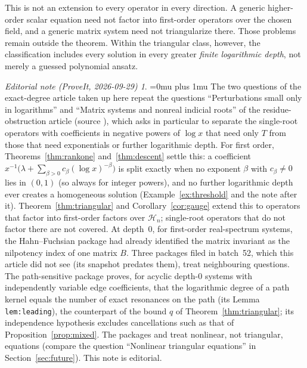 \documentclass[11pt,a4paper]{article}
\numberwithin{equation}{section}
\theoremstyle{definition}
\theoremstyle{remark}\newtheorem{remark}[theorem]{Remark}
\newtheorem*{ednoteinner}{Editorial note (ProveIt, 2026-09-29)}
\newenvironment{ednote}{\begin{ednoteinner}\sloppy\Urlmuskip=0mu plus 1mu\relax}{\end{ednoteinner}}
\newcommand{\Hh}{\mathcal H}\newcommand{\Ll}{\mathcal L}
\begin{document}
This is not an extension to every operator in every direction. A generic higher-order scalar equation need not factor into first-order operators over the chosen field, and a generic matrix system need not triangularize there. Those problems remain outside the theorem. Within the triangular class, however, the classification includes every solution in every greater \emph{finite logarithmic depth}, not merely a guessed polynomial ansatz.

\begin{ednote}
The two questions of the exact-degree article taken up here repeat the questions ``Perturbations small only in logarithms'' and ``Matrix systems and nonreal indicial roots'' of the residue-obstruction article \cite{repo-residue} (source ), which asks in particular to separate the single-root operators with coefficients in negative powers of \(\log x\) that need only \(T\) from those that need exponentials or further logarithmic depth. For first order, Theorems~\ref{thm:rankone} and~\ref{thm:descent} settle this: a coefficient \(x^{-1}\bigl(\lambda+\sum_{\beta>0}c_\beta(\log x)^{-\beta}\bigr)\) is split exactly when no exponent \(\beta\) with \(c_\beta\ne0\) lies in \((0,1)\) (so always for integer powers), and no further logarithmic depth ever creates a homogeneous solution (Example~\ref{ex:threshold} and the note after it). Theorem~\ref{thm:triangular} and Corollary~\ref{cor:gauge} extend this to operators that factor into first-order factors over \(\Hh_n\); single-root operators that do not factor there are not covered. At depth~\(0\), for first-order real-spectrum systems, the Hahn--Fuchsian package \cite{repo-fuchsian} had already identified the matrix invariant as the nilpotency index of one matrix \(B\). Three packages filed in batch~52, which this article did not see (its snapshot predates them), treat neighbouring questions. The path-sensitive package \cite{ed:psh} proves, for acyclic depth-\(0\) systems with independently variable edge coefficients, that the logarithmic degree of a path kernel equals the number of exact resonances on the path (its Lemma \texttt{lem:leading}), the counterpart of the bound \(q\) of Theorem~\ref{thm:triangular}; its independence hypothesis excludes cancellations such as that of Proposition~\ref{prop:mixed}. The packages \cite{ed:nhd} and \cite{ed:ncl} treat nonlinear, not triangular, equations (compare the question ``Nonlinear triangular equations'' in Section~\ref{sec:future}). This note is editorial.
\end{ednote}
\end{document}
